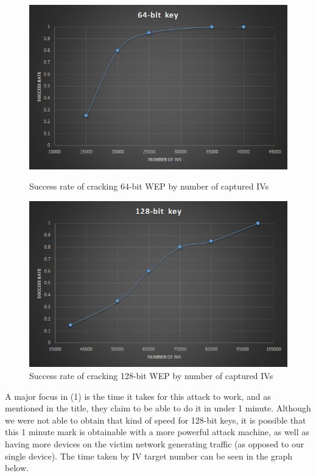 \documentclass[10pt, titlepage]{article}
\begin{document}
\begin{figure}[H]
    \centering
    \begin{minipage}{0.45\textwidth}
        \centering
        \includegraphics[width=1.0\textwidth]{./images/64bit.png} 
        \caption{Success rate of cracking 64-bit WEP by number of captured IVs}
    \end{minipage}\hfill
    \begin{minipage}{0.45\textwidth}
        \centering
        \includegraphics[width=1.0\textwidth]{./images/128bit.png}
        \caption{Success rate of cracking 128-bit WEP by number of captured IVs}
    \end{minipage}
\end{figure}

A major focus in (1) is the time it takes for this attack to work, and as mentioned in the title, they claim to be able to do it in under 1 minute. Although we were not able to obtain that kind of speed for 128-bit keys, it is possible that this 1 minute mark is obtainable with a more powerful attack machine, as well as having more devices on the victim network generating traffic (as opposed to our single device). The time taken by IV target number can be seen in the graph below.
\end{document}
